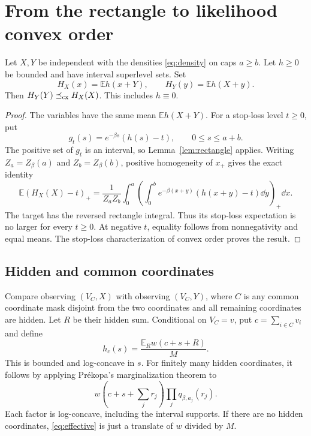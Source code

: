 \documentclass[11pt,a4paper]{article}
\theoremstyle{remark}\newtheorem*{ednote}{Editorial note (ProveIt, 2026-10-01)}
\newcommand{\E}{\mathbb E}\newcommand{\R}{\mathbb R}\newcommand{\N}{\mathbb N}
\begin{document}
\section{From the rectangle to likelihood convex order}
\begin{proposition}\label{prop:pair}
Let $X,Y$ be independent with the densities \eqref{eq:density} on caps $a\ge b$. Let $h\ge0$ be bounded and have interval superlevel sets. Set
\[
 H_X(x)=\E h(x+Y),\qquad H_Y(y)=\E h(X+y).
\]
Then $H_Y(Y)\preceq_{\rm cx}H_X(X)$. This includes $h\equiv0$.
\end{proposition}
\begin{proof}
The variables have the same mean $\E h(X+Y)$. For a stop-loss level $t\ge0$, put
\[
 g_t(s)=e^{-\beta s}(h(s)-t),\qquad 0\le s\le a+b.
\]
The positive set of $g_t$ is an interval, so Lemma~\ref{lem:rectangle} applies. Writing $Z_a=Z_\beta(a)$ and $Z_b=Z_\beta(b)$, positive homogeneity of $x_+$ gives the exact identity
\begin{equation}\label{eq:stoploss}
 \E(H_X(X)-t)_+
 =\frac1{Z_aZ_b}\int_0^a
 \left(\int_0^b e^{-\beta(x+y)}(h(x+y)-t)\dd y\right)_+\dd x.
\end{equation}
The target has the reversed rectangle integral. Thus its stop-loss expectation is no larger for every $t\ge0$. At negative $t$, equality follows from nonnegativity and equal means. The stop-loss characterization of convex order proves the result.
\end{proof}

\subsection{Hidden and common coordinates}
Compare observing $(V_C,X)$ with observing $(V_C,Y)$, where $C$ is any common coordinate mask disjoint from the two coordinates and all remaining coordinates are hidden. Let $R$ be their hidden sum. Conditional on $V_C=v$, put $c=\sum_{i\in C}v_i$ and define
\begin{equation}\label{eq:effective}
 h_c(s)=\frac{\E_R w(c+s+R)}M.
\end{equation}
This is bounded and log-concave in $s$. For finitely many hidden coordinates, it follows by applying Pr\'ekopa's marginalization theorem \cite[Theorem 6]{Prekopa} to
\[
 w\left(c+s+\sum_jr_j\right)\prod_jq_{\beta,a_j}(r_j).
\]
Each factor is log-concave, including the interval supports. If there are no hidden coordinates, \eqref{eq:effective} is just a translate of $w$ divided by $M$.
\end{document}

